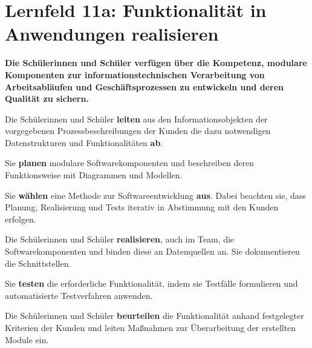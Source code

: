 \chapter{Lernfeld 11a: Funktionalität in Anwendungen realisieren}

\textbf{Die Schülerinnen und Schüler verfügen über die Kompetenz, modulare Komponenten
    zur informationstechnischen Verarbeitung von Arbeitsabläufen und Geschäftsprozessen zu entwickeln und deren Qualität zu sichern.}

Die Schülerinnen und Schüler \textbf{leiten} aus den Informationsobjekten der vorgegebenen Prozessbeschreibungen der Kunden die dazu notwendigen Datenstrukturen und Funktionalitäten \textbf{ab}.

Sie \textbf{planen} modulare Softwarekomponenten und beschreiben deren Funktionsweise mit Diagrammen und Modellen.

Sie \textbf{wählen} eine Methode zur Softwareentwicklung \textbf{aus}. Dabei beachten sie, dass Planung,
Realisierung und Tests iterativ in Abstimmung mit den Kunden erfolgen.

Die Schülerinnen und Schüler \textbf{realisieren}, auch im Team, die Softwarekomponenten und
binden diese an Datenquellen an. Sie dokumentieren die Schnittstellen.

Sie \textbf{testen} die erforderliche Funktionalität, indem sie Testfälle formulieren und automatisierte Testverfahren anwenden.

Die Schülerinnen und Schüler \textbf{beurteilen} die Funktionalität anhand festgelegter Kriterien
der Kunden und leiten Maßnahmen zur Überarbeitung der erstellten Module ein.